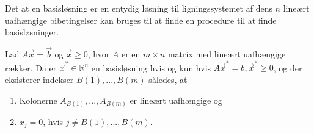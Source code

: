 Det at en basisløsning er en entydig løsning til ligningssystemet af dens $n$ lineært uafhængige bibetingelser kan bruges til at finde en procedure til at finde basisløsninger.

\begin{stn}
Lad $A\vec{x}=\vec{b}$ og $\vec{x}\geq 0$, hvor $A$ er en $m\times n$ matrix med lineært uafhængige rækker. Da er $\vec{x}^*\in \mathds{R}^n$ en basisløsning hvis og kun hvis $A\vec{x}^*=b, \vec{x}^* \geq 0$, og der eksisterer indekser $B(1), ..., B(m)$ således, at
\begin{enumerate}[label=(\alph*)]
\item Kolonerne $A_{B(1)}, ..., A_{B(m)}$ er lineært uafhængige og
\item $x_j = 0$, hvis $j \neq B(1),...,B(m)$.
\end{enumerate}
\label{stn:kravtilbasis}
\end{stn}

